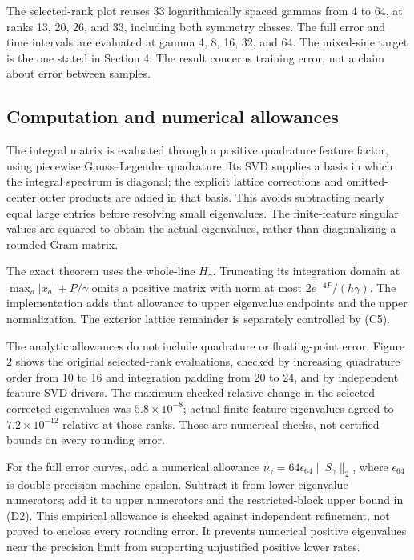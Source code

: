 \documentclass[11pt]{article}
\begin{document}
The selected-rank plot reuses 33 logarithmically spaced gammas from 4 to 64, at ranks 13, 20, 26, and 33, including both symmetry classes. The full error and time intervals are evaluated at gamma 4, 8, 16, 32, and 64. The mixed-sine target is the one stated in Section 4. The result concerns training error, not a claim about error between samples.

\subsection{Computation and numerical allowances}

The integral matrix is evaluated through a positive quadrature feature factor, using piecewise Gauss--Legendre quadrature. Its SVD supplies a basis in which the integral spectrum is diagonal; the explicit lattice corrections and omitted-center outer products are added in that basis. This avoids subtracting nearly equal large entries before resolving small eigenvalues. The finite-feature singular values are squared to obtain the actual eigenvalues, rather than diagonalizing a rounded Gram matrix.

The exact theorem uses the whole-line \(H_\gamma\). Truncating its integration domain at \(\max_a|x_a|+P/\gamma\) omits a positive matrix with norm at most \(2e^{-4P}/(h\gamma)\). The implementation adds that allowance to upper eigenvalue endpoints and the upper normalization. The exterior lattice remainder is separately controlled by (C5).

The analytic allowances do not include quadrature or floating-point error. Figure 2 shows the original selected-rank evaluations, checked by increasing quadrature order from 10 to 16 and integration padding from 20 to 24, and by independent feature-SVD drivers. The maximum checked relative change in the selected corrected eigenvalues was \(5.8\times10^{-8}\); actual finite-feature eigenvalues agreed to \(7.2\times10^{-12}\) relative at those ranks. Those are numerical checks, not certified bounds on every rounding error.

For the full error curves, add a numerical allowance \(\nu_\gamma=64\epsilon_{64}\|S_\gamma\|_2\), where \(\epsilon_{64}\) is double-precision machine epsilon. Subtract it from lower eigenvalue numerators; add it to upper numerators and the restricted-block upper bound in (D2). This empirical allowance is checked against independent refinement, not proved to enclose every rounding error. It prevents numerical positive eigenvalues near the precision limit from supporting unjustified positive lower rates.
\end{document}
